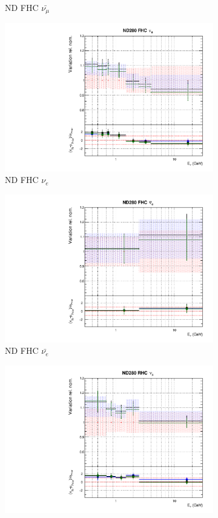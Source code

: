 \begin{figure}
\begin{subfigure}{0.24\textwidth}
  \caption{ND FHC $\bar{\nu_{\mu}}$}
\end{subfigure}
\begin{subfigure}{0.24\textwidth}
  \centering
  \includegraphics[width=0.95\linewidth]{figs/polydataflux_2}
  \caption{ND FHC $\nu_e$}
\end{subfigure}
\begin{subfigure}{0.24\textwidth}
  \centering
  \includegraphics[width=0.95\linewidth]{figs/polydataflux_3}
  \caption{ND FHC $\bar{\nu_{e}}$}
\end{subfigure}
\begin{subfigure}{0.24\textwidth}
  \centering
  \includegraphics[width=0.95\linewidth]{figs/polydataflux_4}

\end{subfigure}
\end{figure}
